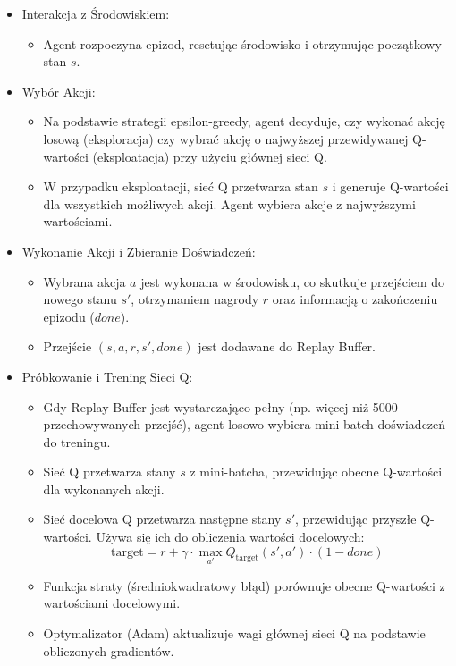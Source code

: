 \documentclass[conference]{IEEEtran}
\begin{document}
\begin{itemize}
    \item Interakcja z Środowiskiem:
    \begin{itemize}
        \item Agent rozpoczyna epizod, resetując środowisko i otrzymując początkowy stan \(s\).
    \end{itemize}
    
    \item Wybór Akcji:
    \begin{itemize}
        \item Na podstawie strategii epsilon-greedy, agent decyduje, czy wykonać akcję losową (eksploracja) czy wybrać akcję o najwyższej przewidywanej Q-wartości (eksploatacja) przy użyciu głównej sieci Q.
        \item W przypadku eksploatacji, sieć Q przetwarza stan \(s\) i generuje Q-wartości dla wszystkich możliwych akcji. Agent wybiera akcje z najwyższymi wartościami.
    \end{itemize}
    
    \item Wykonanie Akcji i Zbieranie Doświadczeń:
    \begin{itemize}
        \item Wybrana akcja \(a\) jest wykonana w środowisku, co skutkuje przejściem do nowego stanu \(s'\), otrzymaniem nagrody \(r\) oraz informacją o zakończeniu epizodu (\(done\)).
        \item Przejście \((s, a, r, s', done)\) jest dodawane do Replay Buffer.
    \end{itemize}
    
    \item Próbkowanie i Trening Sieci Q:
    \begin{itemize}
        \item Gdy Replay Buffer jest wystarczająco pełny (np. więcej niż 5000 przechowywanych przejść), agent losowo wybiera mini-batch doświadczeń do treningu.
        \item Sieć Q przetwarza stany \(s\) z mini-batcha, przewidując obecne Q-wartości dla wykonanych akcji.
        \item Sieć docelowa Q przetwarza następne stany \(s'\), przewidując przyszłe Q-wartości. Używa się ich do obliczenia wartości docelowych:
        \[
        \text{target} = r + \gamma \cdot \max_{a'} Q_{\text{target}}(s', a') \cdot (1 - done)
        \]
        \item Funkcja straty (średniokwadratowy błąd) porównuje obecne Q-wartości z wartościami docelowymi.
        \item Optymalizator (Adam) aktualizuje wagi głównej sieci Q na podstawie obliczonych gradientów.
    \end{itemize}
    

\end{itemize}
\end{document}
